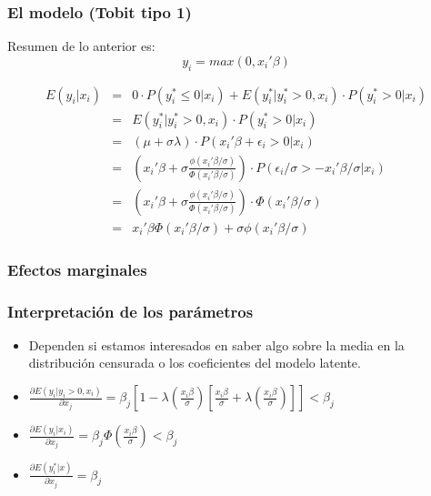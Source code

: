 \begin{frame}
	\frametitle{El modelo (Tobit tipo 1)}
	Resumen de lo anterior es:
	$$y_i=max(0,x_i'\beta)$$
	
	\begin{eqnarray*}
		E(y_i|x_i) &=& 0 \cdot P(y_i^* \leq 0 | x_i) + E(y_i^*|y_i^*>0, x_i) \cdot P(y_i^*>0|x_i) \\
		&=& E(y_i^*|y_i^*>0, x_i) \cdot P(y_i^*>0|x_i) \\
		&=& (\mu+\sigma \lambda) \cdot P(x_i'\beta+\epsilon_i>0|x_i) \\
		&=& (x_i'\beta+\sigma\frac{\phi(x_i'\beta/\sigma)}{\Phi(x_i'\beta/\sigma)}) \cdot P(\epsilon_i/\sigma>-x_i'\beta/\sigma|x_i) \\
		&=& (x_i'\beta+\sigma\frac{\phi(x_i'\beta/\sigma)}{\Phi(x_i'\beta/\sigma)}) \cdot \Phi(x_i'\beta/\sigma) \\
		&=&  x_i'\beta \Phi(x_i'\beta/\sigma)+\sigma \phi(x_i'\beta/\sigma)
	\end{eqnarray*}
	
\end{frame}

\subsubsection{Efectos marginales}
\begin{frame}
	\frametitle{Interpretación de los parámetros}
	
	\begin{itemize}
		\item Dependen si estamos interesados en saber algo sobre la media en la
		distribución censurada o los coeficientes del modelo latente. 
	\end{itemize}
	
	\begin{itemize}
		\item $\frac{\partial E(y_i| y_i>0,x_i)}{\partial x_j}=\beta_j\left[1-\lambda \left( \frac{x_i\beta}{\sigma}\right)\left[ \frac{x_i\beta}{\sigma} +\lambda\left( \frac{x_i\beta}{\sigma}\right)\right]\right]<\beta_j$
		\item $\frac{\partial E(y_i| x_i)}{\partial x_j}=\beta_j \Phi(\frac{x_i\beta}{\sigma})<\beta_j$
		\item  $\frac{\partial E(y_i^*|x)}{\partial
			x_j}=\beta_j$
	\end{itemize}
	
\end{frame}

